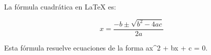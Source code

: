 La fórmula cuadrática en LaTeX es:

$$
x = \frac{-b \pm \sqrt{b^2 - 4ac}}{2a}
$$

Esta fórmula resuelve ecuaciones de la forma ax^2 + bx + c = 0.
